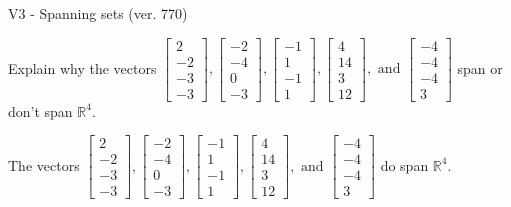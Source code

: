 \begin{exercise}
  \begin{exerciseTitle}V3 - Spanning sets (ver. 770)\end{exerciseTitle}
  \begin{exerciseStatement}
    Explain why the vectors \(\left[\begin{array}{r}
2 \\
-2 \\
-3 \\
-3
\end{array}\right] , \left[\begin{array}{r}
-2 \\
-4 \\
0 \\
-3
\end{array}\right] , \left[\begin{array}{r}
-1 \\
1 \\
-1 \\
1
\end{array}\right] , \left[\begin{array}{r}
4 \\
14 \\
3 \\
12
\end{array}\right] , \text{ and } \left[\begin{array}{r}
-4 \\
-4 \\
-4 \\
3
\end{array}\right]\) span or don't span \(\mathbb{R}^4\). 
	


  \end{exerciseStatement}
  \begin{exerciseAnswer}
   The vectors \(\left[\begin{array}{r}
2 \\
-2 \\
-3 \\
-3
\end{array}\right] , \left[\begin{array}{r}
-2 \\
-4 \\
0 \\
-3
\end{array}\right] , \left[\begin{array}{r}
-1 \\
1 \\
-1 \\
1
\end{array}\right] , \left[\begin{array}{r}
4 \\
14 \\
3 \\
12
\end{array}\right] , \text{ and } \left[\begin{array}{r}
-4 \\
-4 \\
-4 \\
3
\end{array}\right]\) 
  	 do  
	span \(\mathbb{R}^4\).
  



\end{exerciseAnswer}
\end{exercise}
